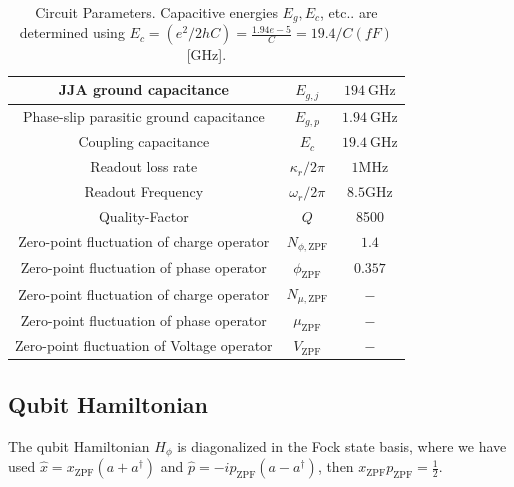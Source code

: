 \documentclass[%
reprint,
superscriptaddress,
 amsmath,amssymb,
 aps,
 prx,
longbibliography,
floatfix,
]{revtex4-2}
\begin{document}
\begin{table}[htb]
\begin{center}
\begin{tabular}{|c |c |c|}
\hline
JJA ground capacitance&$E_{g,j}$&$194 \ \mathrm{GHz}$\\ 
\hline
Phase-slip parasitic ground capacitance&$E_{g,p}$&$1.94 \ \mathrm{GHz}$\\ 
\hline
Coupling capacitance&$E_{c}$ &$19.4 \ \mathrm{GHz}$\\ 
\hline
Readout loss rate&$\kappa_r/2\pi$&$1$MHz\\
\hline
Readout Frequency &$\omega_r/2\pi$&$8.5$GHz\\
\hline
Quality-Factor& $Q$&8500\\
 \hline
  Zero-point fluctuation of charge operator&$N_{\phi,\mathrm{ZPF}}$&$1.4$\\
 \hline
Zero-point fluctuation of phase operator &$\phi_{\mathrm{ZPF}}$&$0.357$\\
 \hline
  Zero-point fluctuation of charge operator&$N_{\mu,\mathrm{ZPF}}$&$-$\\
 \hline
Zero-point fluctuation of phase operator &$\mu_{\mathrm{ZPF}}$&$-$\\
 \hline
  Zero-point fluctuation of Voltage operator&$V_{\mathrm{ZPF}}$&$-$\\
 \hline
\end{tabular}
\end{center}

\caption{Circuit Parameters. Capacitive energies $E_g, E_c$, etc.. are determined using $E_c=(e^2/2hC)=\frac{1.94 e-5}{C}=19.4/C(fF) $[GHz].}
\label{tab:params}
\end{table}

\subsection{Qubit Hamiltonian}\label{app:coupling}
The qubit Hamiltonian $H_{\phi}$ is diagonalized in the Fock state basis, where we have used $\hat x=x_{\mathrm{ZPF}}(a+a^\dagger)$ and $\hat p=-ip_{\mathrm{ZPF}}(a-a^\dagger)$, then $x_{\mathrm{ZPF}}p_{\mathrm{ZPF}}=\frac{1}{2}$. 
\end{document}
